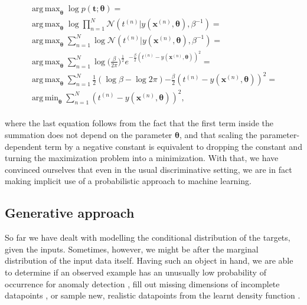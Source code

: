 \documentclass{report}
\DeclareMathOperator*{\argmax}{arg\,max}
\DeclareMathOperator*{\argmin}{arg\,min}
\begin{document}
\begin{equation}
\begin{gathered}
\argmax_{\boldsymbol{\theta}} \log p(\mathbf{t}; \boldsymbol{\theta}) = \\
\argmax_{\boldsymbol{\theta}} \log \prod_{n=1}^N \mathcal{N}(t^{(n)} | y(\boldsymbol{x}^{(n)}, \boldsymbol{\theta}), \beta^{-1}) = \\
\argmax_{\boldsymbol{\theta}} \sum_{n=1}^N \log \mathcal{N}(t^{(n)} | y(\boldsymbol{x}^{(n)}, \boldsymbol{\theta}), \beta^{-1}) = \\
\argmax_{\boldsymbol{\theta}} \sum_{n=1}^N \log \Big(\frac{\beta}{2 \pi}\Big)^{\frac{1}{2}} e^{-\frac{\beta}{2} (t^{(n)} - y(\boldsymbol{x}^{(n)}, \boldsymbol{\theta}))^2} = \\
\argmax_{\boldsymbol{\theta}} \sum_{n=1}^N \frac{1}{2} (\log \beta - \log 2 \pi) {-\frac{\beta}{2} (t^{(n)} - y(\boldsymbol{x}^{(n)}, \boldsymbol{\theta}))^2} = \\
\argmin_{\boldsymbol{\theta}} \sum_{n=1}^N (t^{(n)} - y(\boldsymbol{x}^{(n)}, \boldsymbol{\theta}))^2,
\end{gathered} 
\label{eq:mse-deriv}
\end{equation} \\

\noindent where the last equation follows from the fact that the first term inside the summation does not depend on the parameter $\boldsymbol{\theta}$, and that scaling the parameter-dependent term by a negative constant is equivalent to dropping the constant and turning the maximization problem into a minimization. With that, we have convinced ourselves that even in the usual discriminative setting, we are in fact making implicit use of a probabilistic approach to machine learning. \\

\subsection{Generative approach}

\noindent So far we have dealt with modelling the conditional distribution of the targets, given the inputs. Sometimes, however, we might be after the marginal distribution of the input data itself. Having such an object in hand, we are able to determine if an observed example has an unusually low probability of occurrence for anomaly detection \cite{vae-anomaly}, fill out missing dimensions of incomplete datapoints \cite{missing-data}, or sample new, realistic datapoints from the learnt density function \cite{vaegan}.  \\
\end{document}

